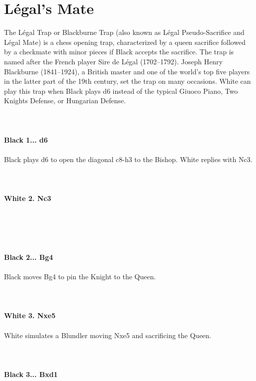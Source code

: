 \documentclass{article}
\begin{document}
\section{ Légal's Mate}

The Légal Trap or Blackburne Trap (also known as Légal Pseudo-Sacrifice and Légal Mate) is a chess opening trap, characterized by a queen sacrifice followed by a checkmate with minor pieces if Black accepts the sacrifice. The trap is named after the French player Sire de Légal (1702–1792). Joseph Henry Blackburne (1841–1924), a British master and one of the world's top five players in the latter part of the 19th century, set the trap on many occasions. White can play this trap when Black plays d6 instead of the typical Giuoco Piano, Two Knights Defense, or Hungarian Defense.\\
\\

\\
\\
\textbf{Black 1... d6}\\
\\
Black plays d6 to open the diagonal c8-h3 to the Bishop. White replies with Nc3.\\
\\

\\
\\
\textbf{White 2. Nc3}\\
\\
\\
\\

\\
\\
\textbf{Black 2... Bg4}\\
\\
Black moves Bg4 to pin the Knight to the Queen.\\
\\

\\
\\
\textbf{White 3. Nxe5}\\
\\
White simulates a Blundler moving Nxe5 and sacrificing the Queen.\\
\\

\\
\\
\textbf{Black 3... Bxd1}\\
\end{document}
